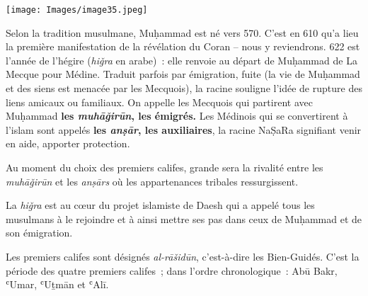 \textbf{}


\texttt{[image: Images/image35.jpeg]}

Selon la tradition musulmane, Muḥammad est né vers 570. C'est en 610
qu'a lieu la première manifestation de la révélation du Coran -- nous y
reviendrons. 622 est l'année de l'hégire (\emph{hiǧra} en arabe)~: elle
renvoie au départ de Muḥammad de La Mecque pour Médine. Traduit parfois
par émigration, fuite (la vie de Muḥammad et des siens est menacée par
les Mecquois), la racine souligne l'idée de rupture des liens amicaux ou
familiaux. On appelle les Mecquois qui partirent avec Muḥammad
\textbf{les \emph{muhāǧirūn}, les émigrés.} Les Médinois qui se
convertirent à l'islam sont appelés \textbf{les \emph{anṣār}, les
auxiliaires}, la racine NaṢaRa signifiant venir en aide, apporter
protection.

Au moment du choix des premiers califes, grande sera la rivalité entre
les \emph{muhāǧirūn} et les \emph{anṣārs} où les appartenances tribales
ressurgissent.

La \emph{hiǧra} est au cœur du projet islamiste de Daesh qui a appelé
tous les musulmans à le rejoindre et à ainsi mettre ses pas dans ceux de
Muḥammad et de son émigration.

Les premiers califes sont désignés \emph{al-rāšidūn}, c'est-à-dire les
Bien-Guidés. C'est la période des quatre premiers califes~; dans l'ordre
chronologique~: Abū Bakr, ʿUmar, ʿUṯmān et ʿAlī.


